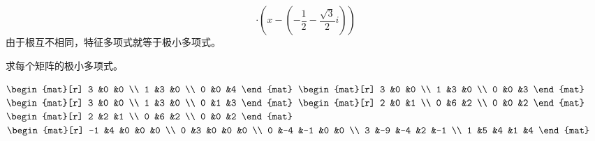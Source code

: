 \begin{exercises}
\begin{answer}
\begin{equation*}
                \cdot (x-(-\frac{1}{2}-\frac{\sqrt{3}}{2}i))
       \end{equation*}
       由于根互不相同，特征多项式就等于极小多项式。
     \end{answer}
  \recommended \item 
    求每个矩阵的极小多项式。
    \begin{exparts*}
       \partsitem \( \begin{mat}[r]
                   3  &0  &0  \\
                   1  &3  &0  \\
                   0  &0  &4
                \end{mat} \)
       \partsitem \( \begin{mat}[r]
                   3  &0  &0  \\
                   1  &3  &0  \\
                   0  &0  &3
                \end{mat} \)
       \partsitem \( \begin{mat}[r]
                   3  &0  &0  \\
                   1  &3  &0  \\
                   0  &1  &3
                \end{mat} \)
       \partsitem \( \begin{mat}[r]
                   2  &0  &1  \\
                   0  &6  &2  \\
                   0  &0  &2
                \end{mat} \)
       \partsitem \( \begin{mat}[r]
                   2  &2  &1  \\
                   0  &6  &2  \\
                   0  &0  &2
                \end{mat} \)
       \partsitem \( \begin{mat}[r]
                   -1 &4  &0  &0  &0  \\
                    0 &3  &0  &0  &0  \\
                    0 &-4 &-1 &0  &0  \\
                    3 &-9 &-4 &2  &-1 \\
                    1 &5  &4  &1  &4
                \end{mat} \)
    \end{exparts*}
    \begin{answer}

\end{answer}
\end{exercises}
